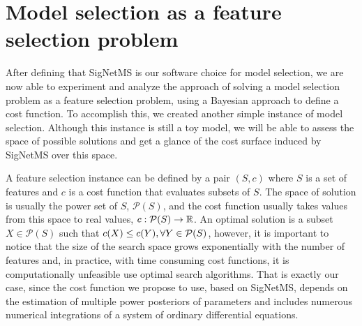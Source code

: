\clearpage
\section{Model selection as a feature selection problem}
After defining that SigNetMS is our software choice for model selection,
we are now able to experiment and analyze the approach of solving a 
model selection problem as a feature selection problem, using a Bayesian
approach to define a cost function. To accomplish this, we created
another simple instance of model selection. Although this instance is
still a toy model, we will be able to assess the space of possible
solutions and get a glance of the cost surface induced by SigNetMS over
this space.

%
%
A feature selection instance can be defined by a pair $(S, c)$ where $S$
is a set of features and $c$ is a cost function that evaluates subsets
of $S$. The space of solution is usually the power set of $S$,
$\mathcal{P}(S)$, and the cost function usually takes values from this 
space to real values, $c: \mathcal{P}(S) \to \mathbb{R}$. An
optimal solution is a subset $X \in \mathcal{P}(S)$ such that $c(X) \leq
c(Y), \forall Y \in \mathcal{P} (S)$, however, it is important to notice
that the size of the search space grows exponentially with the number of
features and, in practice, with time consuming cost functions, it is
computationally unfeasible use optimal search algorithms. That is
exactly our case, since the cost function we propose to use, based on
SigNetMS, depends on the estimation of multiple power posteriors of
parameters and includes numerous numerical integrations of a system of
ordinary differential equations.

